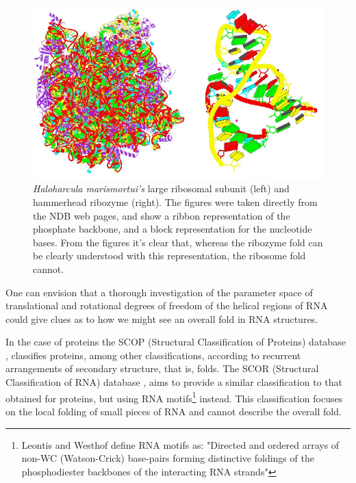 \begin{figure}[t]
\centering
\includegraphics[scale=0.5]{Chapter1/ribosome_ribozyme.png}
\caption{\textit{Haloharcula marismortui's} large ribosomal subunit
(left) and hammerhead ribozyme (right).%
 The figures were taken
directly from the NDB web pages, and show a ribbon
representation of the phosphate backbone, and a block representation
for the nucleotide bases. From the figures it's clear that, whereas the
ribozyme fold can be clearly understood with this representation, the
ribosome fold cannot.}
\end{figure}
%
One can envision that a
thorough investigation of the parameter space of translational and
rotational degrees of freedom of the helical regions of RNA could
give clues as to how we might see an overall fold in RNA structures.

In the case of proteins the SCOP (Structural Classification of
Proteins) database \cite{andreeva2004}, classifies proteins, among
other classifications, according to recurrent arrangements of
secondary structure, that is, folds. The SCOR (Structural
Classification of RNA) database \cite{klosterman2002,
klosterman2004}, aims to provide a similar classification to that
obtained for proteins, but using RNA motifs\footnote{Leontis and
Westhof \cite{leontis2003} define RNA motifs as: "Directed and
ordered arrays of non-WC (Watson-Crick) base-pairs forming
distinctive foldings of the phosphodiester backbones of the
interacting RNA strands"} instead. This classification focuses on the
local folding of small pieces of RNA and cannot
describe the overall fold.

